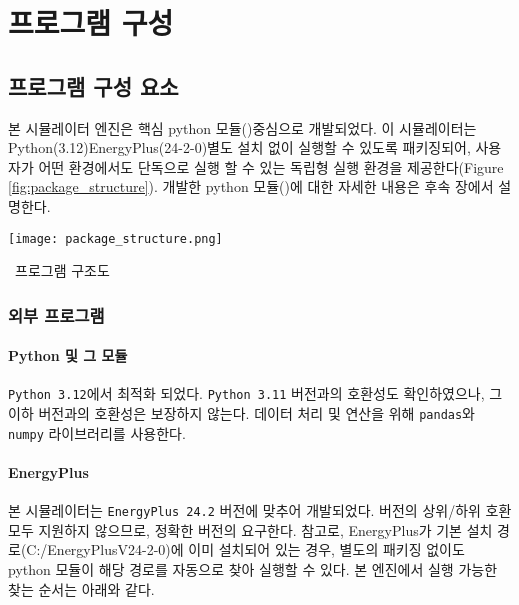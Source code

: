 \part{프로그램 구성}
\label{part:ioref}


\chapter{프로그램 구성 요소}
본 시뮬레이터 엔진은 핵심 python 모듈(\pymodule)\을 중심으로 개발되었다. 이 시뮬레이터는 Python(3.12)\cite{python312}\과 EnergyPlus(24-2-0)\cite{energyplus242}\를 별도 설치 없이 실행할 수 있도록 패키징되어, 사용자가 어떤 환경에서도 단독으로 실행 할 수 있는 독립형 실행 환경을 제공한다(Figure \ref{fig:package_structure}). 개발한 python 모듈(\pymodule)에 대한 자세한 내용은 후속 장에서 설명한다.

\begin{defaultfigure}
  \texttt{[image: package\_structure.png]}
  \caption{\simulator\ 프로그램 구조도}
  \label{fig:package_structure}
\end{defaultfigure}

\section{외부 프로그램}


\subsection{Python 및 그 모듈}
\texttt{Python 3.12}에서 최적화 되었다. \texttt{Python 3.11} 버전과의 호환성도 확인하였으나, 그 이하 버전과의 호환성은 보장하지 않는다.
데이터 처리 및 연산을 위해 \texttt{pandas}와 \texttt{numpy} 라이브러리를 사용한다.

\subsection{EnergyPlus}
본 시뮬레이터는 \texttt{EnergyPlus 24.2} 버전에 맞추어 개발되었다.  버전의 상위/하위 호환 모두 지원하지 않으므로, 정확한 버전의  요구한다.
참고로, EnergyPlus가 기본 설치 경로(C:/EnergyPlusV24-2-0)에 이미 설치되어 있는 경우, 별도의 패키징 없이도 python 모듈이 해당 경로를 자동으로 찾아 실행할 수 있다. 본 엔진에서 실행 가능한 \ep 찾는 순서는 아래와 같다.

